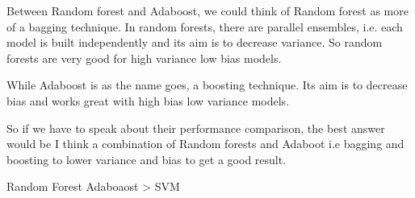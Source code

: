 \documentclass{article}
\begin{document}
Between Random forest and Adaboost, we could think of Random forest as more of a bagging technique. In random forests, there are parallel ensembles, i.e. each model is built independently and its aim is to decrease variance. So random  forests are very good for high variance low bias models.

While Adaboost is as the name goes, a boosting technique. Its aim is to decrease bias and works great with high bias low variance models. 

So if we have to speak about their performance comparison, the best answer would be I think a combination of Random forests and Adaboot i.e bagging and boosting to lower variance and bias to get a good result.



Random Forest \approx  Adaboaost > SVM 
\end{document}
